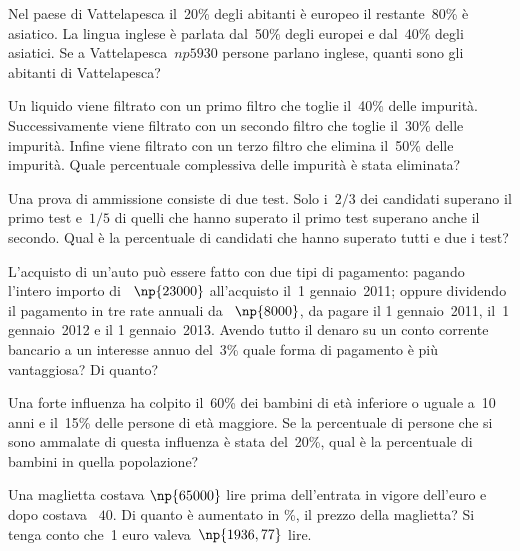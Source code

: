 \begin{multicols}{2}
\begin{esercizio}[\Ast]%
Nel paese di Vattelapesca il~20\% degli abitanti è europeo il
restante~80\% è asiatico. La lingua inglese è parlata dal~50\% degli
europei e dal~40\% degli asiatici. Se a Vattelapesca~$np{5930}$ persone
parlano inglese, quanti sono gli abitanti di Vattelapesca?
\end{esercizio}

\begin{esercizio}%
Un liquido viene filtrato con un primo filtro che toglie il~40\%
delle impurità. Successivamente viene filtrato con un secondo filtro
che toglie il~30\% delle impurità. Infine viene filtrato con un terzo
filtro che elimina il~50\% delle impurità. Quale percentuale
complessiva delle impurità è stata eliminata?
\end{esercizio}

\begin{esercizio}%
Una prova di ammissione consiste di due test. Solo i~$2/3$ dei
candidati superano il primo test e~$1/5$ di quelli che hanno superato il
primo test superano anche il secondo. Qual è la percentuale di
candidati che hanno superato tutti e due i test?
\end{esercizio}

\begin{esercizio}%
L'acquisto di un'auto può essere fatto con due tipi di pagamento: pagando
l'intero importo di \officialeuro~$\np{23000}$ all'acquisto il~1{\textdegree} gennaio~2011; oppure
dividendo il pagamento in tre rate annuali da \officialeuro~$\np{8000}$, da pagare il
1{\textdegree} gennaio~2011, il~1{\textdegree} gennaio~2012 e il
1{\textdegree} gennaio~2013. Avendo tutto il denaro su un conto
corrente bancario a un interesse annuo del~3\% quale forma di pagamento
è più vantaggiosa? Di quanto?
\end{esercizio}

\begin{esercizio}%
Una forte influenza ha colpito il~60\% dei bambini di età
inferiore o uguale a~10 anni e il~15\% delle persone di età maggiore.
Se la percentuale di persone che si sono ammalate di questa influenza
è stata del~20\%, qual è la percentuale di bambini in quella
popolazione?
\end{esercizio}

\begin{esercizio}[\Ast]%
 Una maglietta costava $\np{65000}$ lire prima
dell'entrata in vigore dell'euro e dopo costava \officialeuro~$40$. Di
quanto è aumentato in \%, il prezzo della maglietta? Si
tenga conto che~1 euro valeva~$\np{1936,77}$ lire.
\end{esercizio}


\end{multicols}

